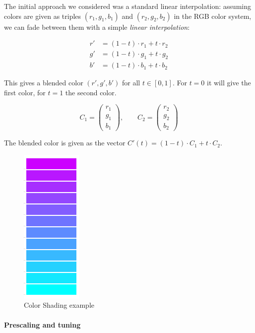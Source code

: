 The initial approach we considered was a standard linear interpolation: assuming colors are given as triples $(r_1,g_1,b_1)$ and $(r_2,g_2,b_2)$ in the RGB color system, we can fade between them with a simple \textit{linear interpolation}:

\begin{align}
r' &= (1-t)\cdot r_1+t\cdot r_2\\
g' &= (1-t)\cdot g_1+t\cdot g_2\\
b' &= (1-t)\cdot b_1+t\cdot b_2
\end{align}

This gives a blended color $(r',g',b')$ for all $t\in[0,1]$. For $t=0$ it will give the first color, for $t=1$ the second color.


$$ C_1=\begin{pmatrix}r_1\\g_1\\b_1\end{pmatrix}, \qquad C_2=\begin{pmatrix}r_2\\g_2\\b_2\end{pmatrix}$$

The blended color is given as the vector $C'(t)=(1-t)\cdot C_1+t\cdot C_2$.


\begin{figure}
  \centering
    \includegraphics{colorshade1}%
    
  \caption{Color Shading example}
  \label{fig:color}
\end{figure}


\paragraph{Prescaling and tuning}

